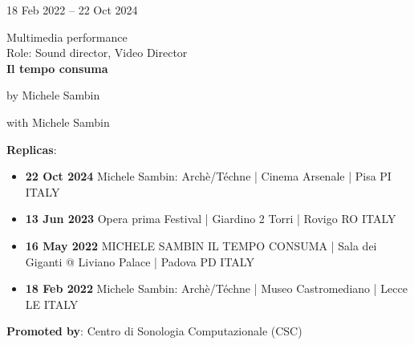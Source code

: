 \documentclass[7pt,a4paper]{article}
\begin{document}
\begin{mdframed}[
    backgroundcolor=white,
    linecolor=white,
    linewidth=0pt,
    innerleftmargin=6pt,
    innerrightmargin=6pt,
    innertopmargin=6pt,
    innerbottommargin=6pt,
    skipabove=0pt,
    skipbelow=0pt
]

\begin{minipage}[t]{0.28\textwidth}

18 Feb 2022 – 22 Oct 2024


\end{minipage}
\begin{minipage}[t]{0.68\textwidth}
\small Multimedia performance
\\\scriptsize Role: Sound director, Video Director
\\ \normalsize \textbf{Il tempo consuma}
\par\scriptsize by Michele Sambin
\par\scriptsize with Michele Sambin
\vspace{0.25cm}



    \scriptsize \textbf{Replicas}:
    \begin{itemize}
    \par
        \item  \textbf{22 Oct 2024}  Michele Sambin: Archè/Téchne  | Cinema Arsenale  | Pisa PI ITALY
    \par
        \item  \textbf{13 Jun 2023}  Opera prima Festival  | Giardino 2 Torri  | Rovigo RO ITALY
    \par
        \item  \textbf{16 May 2022}  MICHELE SAMBIN IL TEMPO CONSUMA  | Sala dei Giganti @ Liviano Palace  | Padova PD ITALY
    \par
        \item  \textbf{18 Feb 2022}  Michele Sambin: Archè/Téchne  | Museo Castromediano  | Lecce LE ITALY
    
    \end{itemize}

\vspace{0.1cm}
\scriptsize

\vspace{0.1cm}
\par \textbf{Promoted by}: Centro di Sonologia Computazionale (CSC)
\end{minipage}
\vspace{0.25cm}
\end{mdframed}
\end{document}
